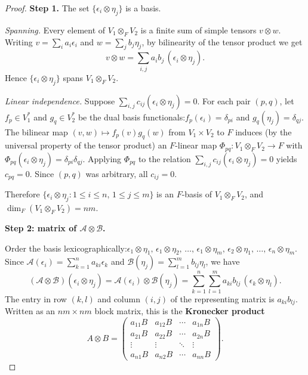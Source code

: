 \begin{proof}
    \textbf{Step 1.} The set $\{\epsilon_i\otimes\eta_j\}$ is a basis.

    \textit{Spanning.} Every element of $V_1\otimes_F V_2$ is a finite sum of simple tensors $v\otimes w$. Writing $v=\sum_i a_i\epsilon_i$ and $w=\sum_j b_j\eta_j$, by bilinearity of the tensor product we get
    \[
        v\otimes w = \sum_{i,j} a_i b_j\,(\epsilon_i\otimes\eta_j).
    \]
    Hence $\{\epsilon_i\otimes\eta_j\}$ spans $V_1\otimes_F V_2$.

    \textit{Linear independence.} Suppose $\sum_{i,j}c_{ij}(\epsilon_i\otimes\eta_j)=0$. For each pair $(p,q)$, let $f_p\in V_1^*$ and $g_q\in V_2^*$ be the dual basis functionals:$f_p(\epsilon_i)=\delta_{pi}$ and $g_q(\eta_j)=\delta_{qj}$. The bilinear map $(v,w)\mapsto f_p(v)g_q(w)$ from $V_1\times V_2$ to $F$ induces (by the universal property of the tensor product) an $F$-linear map $\Phi_{pq}:V_1\otimes_F V_2\to F$ with $\Phi_{pq}(\epsilon_i\otimes\eta_j)=\delta_{pi}\delta_{qj}$. Applying $\Phi_{pq}$ to the relation $\sum_{i,j}c_{ij}(\epsilon_i\otimes\eta_j)=0$ yields $c_{pq}=0$. Since $(p,q)$ was arbitrary, all $c_{ij}=0$.

    Therefore $\{\epsilon_i\otimes\eta_j:1\le i\le n,\,1\le j\le m\}$ is an $F$-basis of $V_1\otimes_F V_2$, and $\dim_F(V_1\otimes_F V_2)=nm$.

    \medskip
    \textbf{Step 2: matrix of $\mathscr{A}\otimes\mathscr{B}$.}

    Order the basis lexicographically:$\epsilon_1\otimes\eta_1,\,\epsilon_1\otimes\eta_2,\,\ldots,\,\epsilon_1\otimes\eta_m,\,\epsilon_2\otimes\eta_1,\,\ldots,\,\epsilon_n\otimes\eta_m$. Since $\mathscr{A}(\epsilon_i)=\sum_{k=1}^n a_{ki}\epsilon_k$ and $\mathscr{B}(\eta_j)=\sum_{l=1}^m b_{lj}\eta_l$, we have
    \[
        (\mathscr{A}\otimes\mathscr{B})(\epsilon_i\otimes\eta_j) = \mathscr{A}(\epsilon_i)\otimes\mathscr{B}(\eta_j) = \sum_{k=1}^n\sum_{l=1}^m a_{ki}b_{lj}\,(\epsilon_k\otimes\eta_l).
    \]
    The entry in row $(k,l)$ and column $(i,j)$ of the representing matrix is $a_{ki}b_{lj}$. Written as an $nm\times nm$ block matrix, this is the \textbf{Kronecker product}
    \[
        A\otimes B = \begin{pmatrix} a_{11}B & a_{12}B & \cdots & a_{1n}B \\ a_{21}B & a_{22}B & \cdots & a_{2n}B \\ \vdots & \vdots & \ddots & \vdots \\ a_{n1}B & a_{n2}B & \cdots & a_{nn}B \end{pmatrix}.
    \]
\end{proof}

